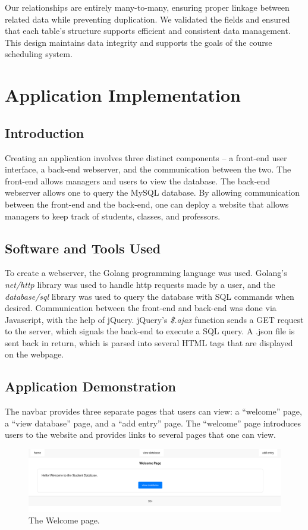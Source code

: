 \documentclass[12pt]{article}
\begin{document}
Our relationships are entirely many-to-many, ensuring proper linkage between related data while preventing duplication. We validated the fields and ensured that each table’s structure supports efficient and consistent data management. This design maintains data integrity and supports the goals of the course scheduling system.

\newpage

\section{Application Implementation}
\subsection{Introduction}
Creating an application involves three distinct components – a front-end user interface, a back-end webserver, and the communication between the two. The front-end allows managers and users to view the database. The back-end webserver allows one to query the MySQL database. By allowing communication between the front-end and the back-end, one can deploy a website that allows managers to keep track of students, classes, and professors.

\subsection{Software and Tools Used}
To create a webserver, the Golang programming language was used. Golang’s \textit{net/http} library was used to handle http requests made by a user, and the \textit{database/sql} library was used to query the database with SQL commands when desired. Communication between the front-end and back-end was done via Javascript, with the help of jQuery. jQuery's \textit{\$.ajax} function sends a GET request to the server, which signals the back-end to execute a SQL query. A .json file is sent back in return, which is parsed into several HTML tags that are displayed on the webpage.

\subsection{Application Demonstration}
The navbar provides three separate pages that users can view: a “welcome” page, a “view database” page, and a “add entry” page. The “welcome” page introduces users to the website and provides links to several pages that one can view.

\begin{figure}[h]
    \centering
    \includegraphics[width=1\textwidth]{images/img1.png}
    \caption{The Welcome page.}
    \label{fig:mesh1}
\end{figure}
\end{document}
